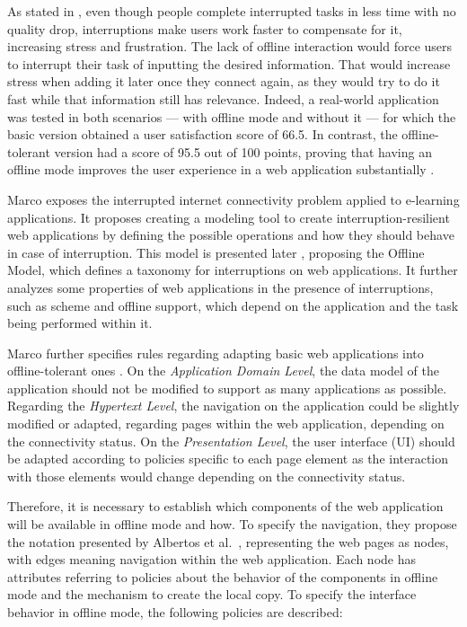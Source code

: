 As stated in \cite{Mark2008}, even though people complete interrupted tasks in less time with no quality drop, interruptions make users work faster to compensate for it, increasing stress and frustration. The lack of offline interaction would force users to interrupt their task of inputting the desired information. That would increase stress when adding it later once they connect again, as they would try to do it fast while that information still has relevance. Indeed, a real-world application was tested in both scenarios --- with offline mode and without it --- for which the basic version obtained a user satisfaction score of 66.5. In contrast, the offline-tolerant version had a score of 95.5 out of 100 points, proving that having an offline mode improves the user experience in a web application substantially \cite{Marco2015}. 

Marco \cite{Marco2013} exposes the interrupted internet connectivity problem applied to e-learning applications. It proposes creating a modeling tool to create interruption-resilient web applications by defining the possible operations and how they should behave in case of interruption. This model is presented later \cite{Abertos-Marco2017}, proposing the Offline Model, which defines a taxonomy for interruptions on web applications. It further analyzes some properties of web applications in the presence of interruptions, such as scheme and offline support, which depend on the application and the task being performed within it.

Marco further specifies rules regarding adapting basic web applications into offline-tolerant ones \cite{Marco2015}. On the \textit{Application Domain Level}, the data model of the application should not be modified to support as many applications as possible. Regarding the \textit{Hypertext Level}, the navigation on the application could be slightly modified or adapted, regarding pages within the web application, depending on the connectivity status. On the \textit{Presentation Level}, the user interface (UI) should be adapted according to policies specific to each page element as the interaction with those elements would change depending on the connectivity status.

Therefore, it is necessary to establish which components of the web application will be available in offline mode and how.
To specify the navigation, they propose the notation presented by Albertos et al.\ \cite{Penichet2013}, representing the web pages as nodes, with edges meaning navigation within the web application. Each node has attributes referring to policies about the behavior of the components in offline mode and the mechanism to create the local copy. To specify the interface behavior in offline mode, the following policies are described:

